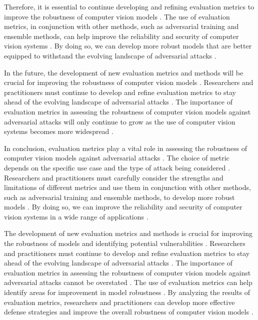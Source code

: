 \documentclass[11pt]{article}
\begin{document}
Therefore, it is essential to continue developing and refining evaluation metrics to improve the robustness of computer vision models \cite{ref153}. The use of evaluation metrics, in conjunction with other methods, such as adversarial training and ensemble methods, can help improve the reliability and security of computer vision systems \cite{ref154}. By doing so, we can develop more robust models that are better equipped to withstand the evolving landscape of adversarial attacks \cite{ref155}.

In the future, the development of new evaluation metrics and methods will be crucial for improving the robustness of computer vision models \cite{ref143}. Researchers and practitioners must continue to develop and refine evaluation metrics to stay ahead of the evolving landscape of adversarial attacks \cite{ref151}. The importance of evaluation metrics in assessing the robustness of computer vision models against adversarial attacks will only continue to grow as the use of computer vision systems becomes more widespread \cite{ref152}.

In conclusion, evaluation metrics play a vital role in assessing the robustness of computer vision models against adversarial attacks \cite{ref156}. The choice of metric depends on the specific use case and the type of attack being considered \cite{ref157}. Researchers and practitioners must carefully consider the strengths and limitations of different metrics and use them in conjunction with other methods, such as adversarial training and ensemble methods, to develop more robust models \cite{ref158}. By doing so, we can improve the reliability and security of computer vision systems in a wide range of applications \cite{ref159}.

The development of new evaluation metrics and methods is crucial for improving the robustness of models and identifying potential vulnerabilities \cite{ref160}. Researchers and practitioners must continue to develop and refine evaluation metrics to stay ahead of the evolving landscape of adversarial attacks \cite{ref161}. The importance of evaluation metrics in assessing the robustness of computer vision models against adversarial attacks cannot be overstated \cite{ref162}. The use of evaluation metrics can help identify areas for improvement in model robustness \cite{ref163}. By analyzing the results of evaluation metrics, researchers and practitioners can develop more effective defense strategies and improve the overall robustness of computer vision models \cite{ref164}.
\end{document}
